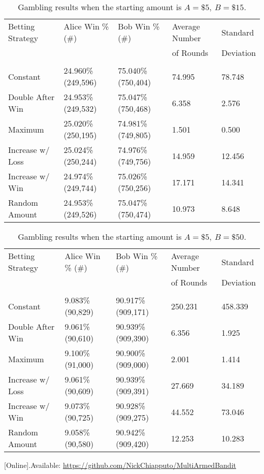 \documentclass[12pt]{article}
\begin{document}
		\begin{table}[H]
			\begin{center}
				\begin{tabular}{l|l|l|l|l}
					Betting Strategy 	& Alice Win \% (\#) 	& Bob Win \% (\#)		& Average Number 	& Standard  	\\
										&						&						& of Rounds 		& Deviation				\\
					\hline
					\vspace{ -0.15in }	&						&						&					&	\\
					Constant 			& 24.960\% (249,596)	& 75.040\% (750,404)	& 74.995			& 78.748	\\
					Double After Win	& 24.953\% (249,532)	& 75.047\% (750,468)	& 6.358				& 2.576	\\
					Maximum				& 25.020\% (250,195)	& 74.981\% (749,805)	& 1.501				& 0.500	\\
					Increase w/ Loss 	& 25.024\% (250,244)	& 74.976\% (749,756)	& 14.959			& 12.456	\\
					Increase w/ Win		& 24.974\% (249,744)	& 75.026\% (750,256)	& 17.171			& 14.341	\\
					Random Amount 		& 24.953\% (249,526)	& 75.047\% (750,474)	& 10.973			& 8.648	\\
				\end{tabular}
				\caption{Gambling results when the starting amount is $A = \$5,\ B = \$15$.}
				\label{tab:3a-b}
			\end{center}
		\end{table}

		\begin{table}[H]
			\begin{center}
				\begin{tabular}{l|l|l|l|l}
					Betting Strategy 	& Alice Win \% (\#) 	& Bob Win \% (\#)		& Average Number 	& Standard  	\\
										&						&						& of Rounds 		& Deviation				\\
					\hline
					\vspace{ -0.15in }	&						&						&					&	\\
					Constant 			& 9.083\% (90,829)		& 90.917\% (909,171)	& 250.231			& 458.339	\\
					Double After Win	& 9.061\% (90,610)		& 90.939\% (909,390)	& 6.356				& 1.925	\\
					Maximum				& 9.100\% (91,000)		& 90.900\% (909,000)	& 2.001				& 1.414	\\
					Increase w/ Loss 	& 9.061\% (90,609)		& 90.939\% (909,391)	& 27.669			& 34.189	\\
					Increase w/ Win		& 9.073\% (90,725)		& 90.928\% (909,275)	& 44.552			& 73.046	\\
					Random Amount 		& 9.058\% (90,580)		& 90.942\% (909,420)	& 12.253			& 10.283 	\\
				\end{tabular}
				\caption{Gambling results when the starting amount is $A = \$5,\ B = \$50$.}
				\label{tab:10a-b}
			\end{center}
		\end{table}

	\begin{thebibliography}{00}
		 [Online].Available: \url{https://github.com/NickChiapputo/MultiArmedBandit}
	\end{thebibliography}
\end{document}

